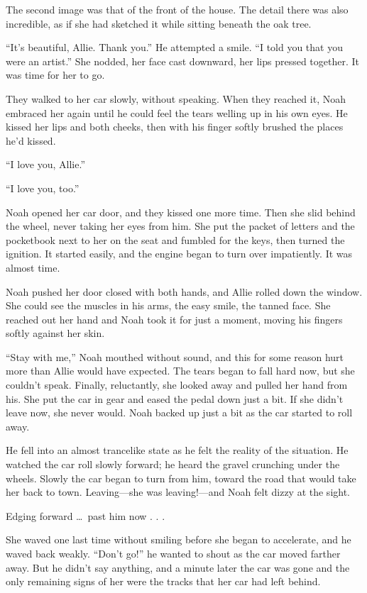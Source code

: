 \documentclass[10pt, twoside, openright]{book}
\begin{document}
The second image was that of the front of the house. The detail there
was also incredible, as if she had sketched it while sitting beneath the
oak tree.

``It's beautiful, Allie. Thank you.'' He attempted a smile. ``I told you
that you were an artist.'' She nodded, her face cast downward, her lips
pressed together. It was time for her to go.

They walked to her car slowly, without speaking. When they reached it,
Noah embraced her again until he could feel the tears welling up in his
own eyes. He kissed her lips and both cheeks, then with his finger
softly brushed the places he'd kissed.


``I love you, Allie.''

``I love you, too.''


Noah opened her car door, and they kissed one more time. Then she slid
behind the wheel, never taking her eyes from him. She put the packet of
letters and the pocketbook next to her on the seat and fumbled for the
keys, then turned the ignition. It started easily, and the engine began
to turn over impatiently. It was almost time.

Noah pushed her door closed with both hands, and Allie rolled down the
window. She could see the muscles in his arms, the easy smile, the
tanned face. She reached out her hand and Noah took it for just a
moment, moving his fingers softly against her skin.

``Stay with me,'' Noah mouthed without sound, and this for some reason
hurt more than Allie would have expected. The tears began to fall hard
now, but she couldn't speak. Finally, reluctantly, she looked away and
pulled her hand from his. She put the car in gear and eased the pedal
down just a bit. If she didn't leave now, she never would. Noah backed
up just a bit as the car started to roll away.

He fell into an almost trancelike state as he felt the reality of the
situation. He watched the car roll slowly forward; he heard the gravel
crunching under the wheels. Slowly the car began to turn from him,
toward the road that would take her back to town. Leaving---she was
leaving!---and Noah felt dizzy at the sight.


Edging forward   \dots\ past him now . . .


She waved one last time without smiling before she began to accelerate,
and he waved back weakly. ``Don't go!'' he wanted to shout as the car
moved farther away. But he didn't say anything, and a minute later the
car was gone and the only remaining signs of her were the tracks that
her car had left behind.
\end{document}

